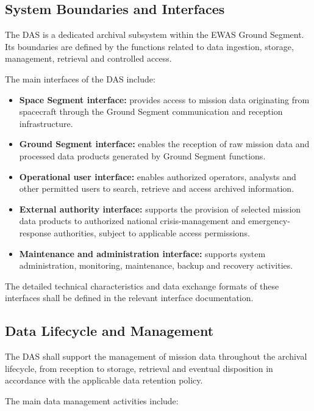 \subsection{System Boundaries and Interfaces}

The DAS is a dedicated archival subsystem within the EWAS Ground Segment. Its boundaries are defined by the functions related to data ingestion, storage, management, retrieval and controlled access.

The main interfaces of the DAS include:

\begin{itemize}
    \item \textbf{Space Segment interface:} provides access to mission data originating from spacecraft through the Ground Segment communication and reception infrastructure.
    \item \textbf{Ground Segment interface:} enables the reception of raw mission data and processed data products generated by Ground Segment functions.
    \item \textbf{Operational user interface:} enables authorized operators, analysts and other permitted users to search, retrieve and access archived information.
    \item \textbf{External authority interface:} supports the provision of selected mission data products to authorized national crisis-management and emergency-response authorities, subject to applicable access permissions.
    \item \textbf{Maintenance and administration interface:} supports system administration, monitoring, maintenance, backup and recovery activities.
\end{itemize}

The detailed technical characteristics and data exchange formats of these interfaces shall be defined in the relevant interface documentation.

\subsection{Data Lifecycle and Management}

The DAS shall support the management of mission data throughout the archival lifecycle, from reception to storage, retrieval and eventual disposition in accordance with the applicable data retention policy.

The main data management activities include:

